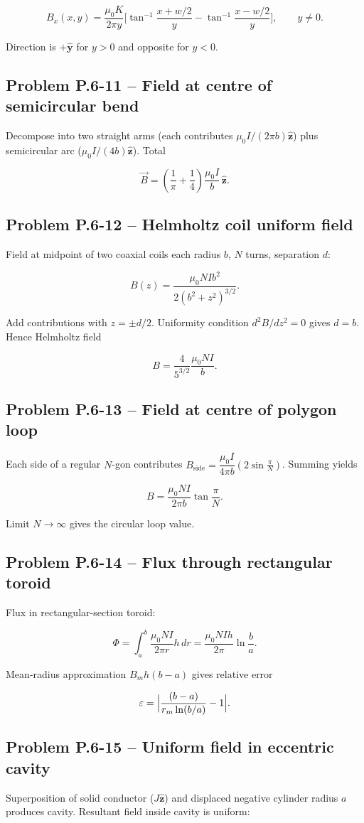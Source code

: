 \documentclass[12pt]{article}
\begin{document}
\[
B_x(x,y)=\frac{\mu_0 K}{2\pi y}\bigl[\tan^{-1}\frac{x+w/2}{y}-\tan^{-1}\frac{x-w/2}{y}\bigr],\qquad y\neq0.
\]

Direction is \(+\hat{\mathbf y}\) for \(y>0\) and opposite for \(y<0\).
\n\bigskip\n\subsection*{Problem P.6-11 – Field at centre of semicircular bend}\n
Decompose into two straight arms (each contributes \(\mu_0 I/(2\pi b)\hat{\mathbf z}\)) plus semicircular arc (\(\mu_0 I/(4b)\hat{\mathbf z}\)).  Total

\[
\vec B=\left(\frac{1}{\pi}+\frac14\right)\frac{\mu_0 I}{b}\,\hat{\mathbf z}.
\]
\n\bigskip\n\subsection*{Problem P.6-12 – Helmholtz coil uniform field}\n
Field at midpoint of two coaxial coils each radius \(b\), \(N\) turns, separation \(d\):

\[
B(z)=\frac{\mu_0 N I b^{2}}{2(b^{2}+z^{2})^{3/2}}.
\]

Add contributions with \(z=\pm d/2\).  Uniformity condition \(d^{2}B/dz^{2}=0\) gives \(d=b\).  Hence Helmholtz field

\[
B=\frac{4}{5^{3/2}}\frac{\mu_0 N I}{b}.
\]
\n\bigskip\n\subsection*{Problem P.6-13 – Field at centre of polygon loop}\n
Each side of a regular \(N\)-gon contributes \(B_{\text{side}}=\dfrac{\mu_0 I}{4\pi b}(2\sin\frac{\pi}{N})\).  Summing yields

\[
B=\frac{\mu_0 N I}{2\pi b}\tan\frac{\pi}{N}.
\]

Limit \(N\to\infty\) gives the circular loop value.
\n\bigskip\n\subsection*{Problem P.6-14 – Flux through rectangular toroid}\n
Flux in rectangular‑section toroid:

\[
\Phi=\int_{a}^{b}\frac{\mu_0 N I}{2\pi r}h\,dr
     =\frac{\mu_0 N I h}{2\pi}\ln\frac{b}{a}.
\]

Mean‑radius approximation \(B_mh(b-a)\) gives relative error

\[
\varepsilon=\Bigl|\frac{(b-a)}{r_m\ln(b/a)}-1\Bigr|.
\]
\n\bigskip\n\subsection*{Problem P.6-15 – Uniform field in eccentric cavity}\n
Superposition of solid conductor (\(J\hat{\mathbf z}\)) and displaced negative cylinder radius \(a\) produces cavity.  Resultant field inside cavity is uniform:
\end{document}
